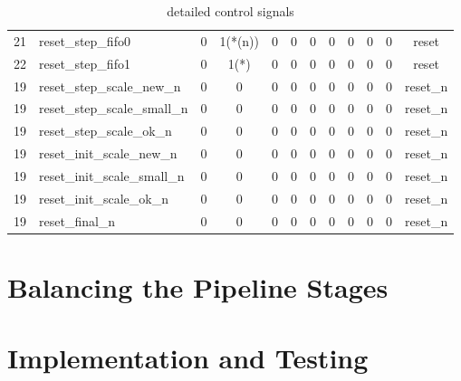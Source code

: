 \documentclass[mscthesis]{usiinfthesis}
\begin{document}
\begin{table}
\begin{center}
\begin{tabular}{|c|l|*{10}{c|}}
    21   & reset\_step\_fifo0          & 0    & 1(*(n))& 0    & 0          & 0      & 0      & 0    & 0    & 0     & reset       \\
    22   & reset\_step\_fifo1          & 0    & 1(*)   & 0    & 0          & 0      & 0      & 0    & 0    & 0     & reset       \\
    19   & reset\_step\_scale\_new\_n  & 0    & 0      & 0    & 0          & 0      & 0      & 0    & 0    & 0     & reset\_n    \\
    19   & reset\_step\_scale\_small\_n& 0    & 0      & 0    & 0          & 0      & 0      & 0    & 0    & 0     & reset\_n    \\
    19   & reset\_step\_scale\_ok\_n   & 0    & 0      & 0    & 0          & 0      & 0      & 0    & 0    & 0     & reset\_n    \\
    19   & reset\_init\_scale\_new\_n  & 0    & 0      & 0    & 0          & 0      & 0      & 0    & 0    & 0     & reset\_n    \\
    19   & reset\_init\_scale\_small\_n& 0    & 0      & 0    & 0          & 0      & 0      & 0    & 0    & 0     & reset\_n    \\
    19   & reset\_init\_scale\_ok\_n   & 0    & 0      & 0    & 0          & 0      & 0      & 0    & 0    & 0     & reset\_n    \\
    19   & reset\_final\_n             & 0    & 0      & 0    & 0          & 0      & 0      & 0    & 0    & 0     & reset\_n    \\
    \hline
    \end{tabular}
    \end{center}
    \caption{detailed control signals}
    \label{tab:ctrl_detailed}
\end{table}

\section{Balancing the Pipeline Stages}

\section{Implementation and Testing}
\end{document}
